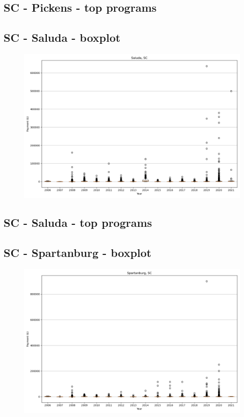 \subsection*{SC - Pickens - top programs}

\newpage
\subsection*{SC - Saluda - boxplot}
\begin{figure}[h]
\centering
\includegraphics[width=7in]{../output/boxplots/counties/Saluda-SC_boxplot.png}
\end{figure}


\subsection*{SC - Saluda - top programs}

\newpage
\subsection*{SC - Spartanburg - boxplot}
\begin{figure}[h]
\centering
\includegraphics[width=7in]{../output/boxplots/counties/Spartanburg-SC_boxplot.png}
\end{figure}


